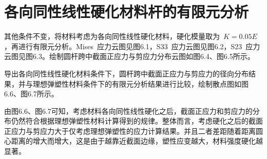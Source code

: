 \chapter{各向同性线性硬化材料杆的有限元分析}
\label{cha:abaqus_hardened}
其他条件不变，将材料考虑为各向同性线性硬化材料，硬化模量取为~{$K=0.05E$}，再进行有限元分析。Mises~应力云图见图6.1，S33~应力云图见图6.2，S23~应力云图见图6.3。绘制圆杆跨中截面正应力与剪应力分布云图如图6.4、图6.5所示。


导出各向同性线性硬化材料条件下，圆杆跨中截面正应力与剪应力的径向分布结果，并与理想弹塑性材料条件下的有限元分析结果进行比较，绘制散点图如图6.6、图6.7所示。


由图6.6、图6.7可知，考虑材料各向同性线性硬化之后，截面正应力和剪应力的分布仍然符合根据理想弹塑性材料计算得到的规律。整体而言，考虑硬化之后的截面正应力与剪应力大于仅考虑理想弹塑性的应力计算结果。并且二者差距随着距离圆心距离的增大而增大，这是由于越靠近截面边缘，塑性应变越大，材料强度硬化越显著。